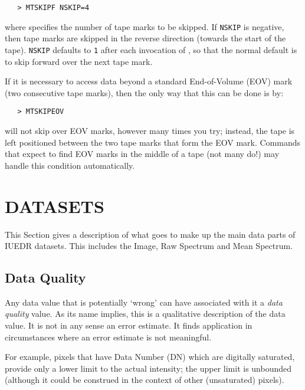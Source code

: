 \begin{verbatim}
   > MTSKIPF NSKIP=4
\end{verbatim}

where 
 specifies the number of tape marks to be skipped.  If
\verb+NSKIP+
is negative, then tape marks are skipped in the reverse direction
(towards the start of the tape)\@.  \verb+NSKIP+ defaults to \verb+1+ after each
invocation of , so that the normal
default is to skip forward over the next tape mark.

If it is necessary to access data beyond a standard End-of-Volume (EOV) mark
(two consecutive tape marks), then the only way that this can be done is by:

\begin{verbatim}
   > MTSKIPEOV
\end{verbatim}

 will not skip over EOV marks, however many times you try; instead,
the tape is left positioned between the two tape marks that form the EOV mark.
Commands that expect to find EOV marks in the middle of a tape (not
many do!) may handle this condition automatically.


\section{\label{se:datasets}DATASETS}

This Section gives a description of what goes to make up the main data parts
of IUEDR datasets.  This includes the Image, Raw Spectrum and Mean Spectrum.


\subsection{Data Quality}

Any data value that is potentially `wrong' can have associated with it a {\em
data quality} value.  As its name implies, this is a qualitative description of
the data value.  It is not in any sense an error estimate.  It finds
application in circumstances where an error estimate is not meaningful.

For example, pixels that have Data Number (DN) which are digitally
saturated, provide only a lower limit to the actual intensity; the
upper limit is unbounded (although it could be construed in the context
of other (unsaturated) pixels)\@.


